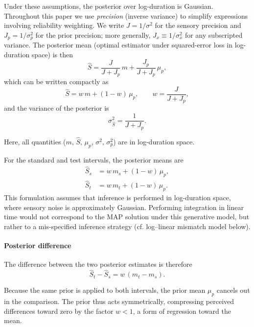 \documentclass[9pt,lineno,doublespacing]{elife}
\begin{document}
Under these assumptions, the posterior over log-duration is Gaussian.  Throughout this paper we use \emph{precision} (inverse variance) to simplify expressions involving reliability weighting.  We write $J = 1/\sigma^2$ for the sensory precision and $J_p = 1/\sigma_p^2$ for the prior precision; more generally, $J_x \equiv 1/\sigma_x^2$ for any subscripted variance.  The posterior mean (optimal estimator under squared-error loss in log-duration space) is then
\begin{equation}
\hat{S}
=
\frac{J}{J + J_p} \, m
+
\frac{J_p}{J + J_p} \, \mu_p,
\label{eq:posterior_mean}
\end{equation}
which can be written compactly as
\begin{equation}
\hat{S}
=
w\, m + (1-w)\,\mu_p,
\qquad
w = \frac{J}{J + J_p},
\label{eq:posterior_weight}
\end{equation}
and the variance of the posterior is
\begin{equation}
\sigma_{\hat{S}}^2 = \frac{1}{J + J_p}.
\label{eq:posterior_var}
\end{equation}

Here, all quantities ($m$, $\hat{S}$, $\mu_p$, $\sigma^2$, $\sigma_p^2$) are in log-duration space.

For the standard and test intervals, the posterior means are
\begin{align}
\hat{S}_s &= w\, m_s + (1-w)\,\mu_p,
\label{eq:posterior_standard} \\
\hat{S}_t &= w\, m_t + (1-w)\,\mu_p.
\label{eq:posterior_test}
\end{align}
This formulation assumes that inference is performed in log-duration space, where sensory noise is approximately Gaussian. Performing integration in linear time would not correspond to the MAP solution under this generative model, but rather to a mis-specified inference strategy (cf. log–linear mismatch model below).

\paragraph{Posterior difference}

The difference between the two posterior estimates is therefore
\begin{equation}
\hat{S}_t - \hat{S}_s
=
w\,(m_t - m_s).
\label{eq:posterior_difference}
\end{equation}

Because the same prior is applied to both intervals, the prior mean $\mu_p$ cancels out in the comparison. The prior thus acts symmetrically, compressing perceived differences toward zero by the factor $w < 1$, a form of regression toward the mean.
\end{document}
